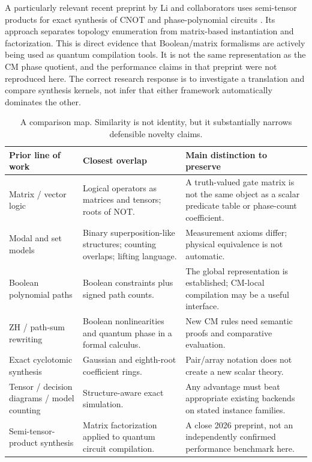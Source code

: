 A particularly relevant recent preprint by Li and collaborators uses semi-tensor products for exact synthesis of CNOT and phase-polynomial circuits \cite{stp2026}. Its approach separates topology enumeration from matrix-based instantiation and factorization. This is direct evidence that Boolean/matrix formalisms are actively being used as quantum compilation tools. It is not the same representation as the CM phase quotient, and the performance claims in that preprint were not reproduced here. The correct research response is to investigate a translation and compare synthesis kernels, not infer that either framework automatically dominates the other.

\begin{table}[htbp]
\centering\small
\begin{tabularx}{\textwidth}{@{}L{0.26\textwidth}Y Y@{}}
\toprule
Prior line of work & Closest overlap & Main distinction to preserve\\
\midrule
Matrix / vector logic & Logical operators as matrices and tensors; roots of NOT. & A truth-valued gate matrix is not the same object as a scalar predicate table or phase-count coefficient.\\
Modal and set models & Binary superposition-like structures; counting overlaps; lifting language. & Measurement axioms differ; physical equivalence is not automatic.\\
Boolean polynomial paths & Boolean constraints plus signed path counts. & The global representation is established; CM-local compilation may be a useful interface.\\
ZH / path-sum rewriting & Boolean nonlinearities and quantum phase in a formal calculus. & New CM rules need semantic proofs and comparative evaluation.\\
Exact cyclotomic synthesis & Gaussian and eighth-root coefficient rings. & Pair/array notation does not create a new scalar theory.\\
Tensor / decision diagrams / model counting & Structure-aware exact simulation. & Any advantage must beat appropriate existing backends on stated instance families.\\
Semi-tensor-product synthesis & Matrix factorization applied to quantum circuit compilation. & A close 2026 preprint, not an independently confirmed performance benchmark here.\\
\bottomrule
\end{tabularx}
\caption{A comparison map. Similarity is not identity, but it substantially narrows defensible novelty claims.}
\end{table}


